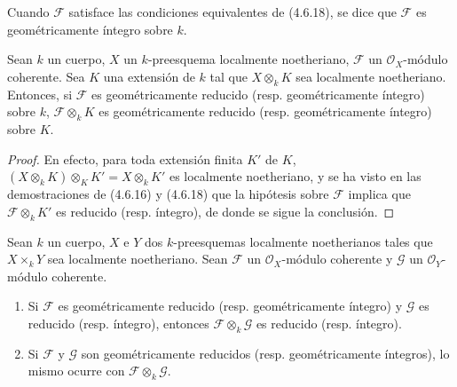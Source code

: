 \begin{definition}[4.6.19]
\label{IV.2.4.6.19-fr}
Cuando $\mathscr F$ satisface las condiciones equivalentes de \textup{(4.6.18)}, se dice
que $\mathscr F$ es geométricamente íntegro sobre $k$.
\end{definition}

\begin{proposition}[4.6.20]
\label{IV.2.4.6.20-fr}
Sean $k$ un cuerpo, $X$ un $k$-preesquema localmente noetheriano, $\mathscr F$
un $\mathcal O_X$-módulo coherente. Sea $K$ una extensión de $k$ tal que
$X\otimes_k K$ sea localmente noetheriano. Entonces, si $\mathscr F$ es
geométricamente reducido \textup{(resp.} geométricamente íntegro) sobre $k$,
$\mathscr F\otimes_k K$ es geométricamente reducido \textup{(resp.} geométricamente
íntegro) sobre $K$.
\end{proposition}

\begin{proof}
En efecto, para toda extensión finita $K'$ de $K$,
$(X\otimes_k K)\otimes_K K'=X\otimes_k K'$
es localmente noetheriano, y se ha visto en las demostraciones de (4.6.16) y
(4.6.18) que la hipótesis sobre $\mathscr F$ implica que
$\mathscr F\otimes_k K'$ es reducido (resp. íntegro), de donde se sigue la
conclusión.
\end{proof}

\begin{proposition}[4.6.21]
\label{IV.2.4.6.21-fr}
Sean $k$ un cuerpo, $X$ e $Y$ dos $k$-preesquemas localmente noetherianos tales
que $X\times_k Y$ sea localmente noetheriano. Sean $\mathscr F$ un
$\mathcal O_X$-módulo coherente y $\mathscr G$ un $\mathcal O_Y$-módulo
coherente.
\begin{enumerate}
\item[\textup{(i)}] Si $\mathscr F$ es geométricamente reducido \textup{(resp.} geométricamente
íntegro) y $\mathscr G$ es reducido \textup{(resp.} íntegro), entonces
$\mathscr F\otimes_k\mathscr G$ es reducido \textup{(resp.} íntegro).
\item[\textup{(ii)}] Si $\mathscr F$ y $\mathscr G$ son geométricamente reducidos \textup{(resp.}
geométricamente íntegros), lo mismo ocurre con
$\mathscr F\otimes_k\mathscr G$.
\end{enumerate}
\end{proposition}

